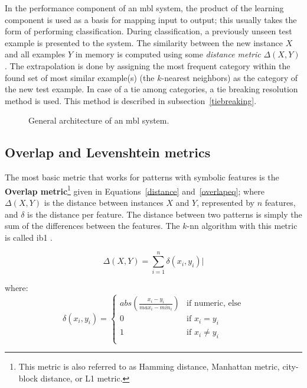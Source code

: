\documentclass{report}
\begin{document}
In the performance component of an {\sc mbl} system, the product of
the learning component is used as a basis for mapping input to output;
this usually takes the form of performing classification.  During
classification, a previously unseen test example is presented to the
system. The similarity between the new instance $X$ and all examples
$Y$ in memory is computed using some {\em distance metric}
$\Delta(X,Y)$. The extrapolation is done by assigning the most
frequent category within the found set of most similar example(s) (the
$k$-nearest neighbors) as the category of the new test example. In
case of a tie among categories, a tie breaking resolution method is
used. This method is described in subsection~\ref{tiebreaking}.

\begin{figure}[htb]
        \begin{center}
                \leavevmode
                \epsfxsize=8cm
                \caption{General architecture of an {\sc mbl} system.
                }
                \label{mbl-method}
        \end{center}
\end{figure}

\subsection{Overlap and Levenshtein metrics}
\label{overlap}

The most basic metric that works for patterns with symbolic features
is the {\bf Overlap metric}\footnote{This metric is also referred to
as Hamming distance, Manhattan metric, city-block distance, or L1
metric.} given in Equations~\ref{distance} and~\ref{overlapeq}; where
$\Delta(X,Y)$ is the distance between instances $X$ and $Y$,
represented by $n$ features, and $\delta$ is the distance per
feature. The distance between two patterns is simply the sum of the
differences between the features. The $k$-{\sc nn} algorithm with this
metric is called {\sc ib1} \cite{Aha+91}. 

\begin{equation}
\Delta(X,Y) = \sum_{i=1}^{n} \delta(x_{i},y_{i}) |
\label{distance}
\end{equation}

where:
\begin{equation}
\delta(x_{i}, y_{i}) = \left\{ \begin{array}{ll}
		abs(\frac{x_{i}-y_{i}}{max_{i}-min_{i}}) & \mbox{if numeric, else}\\
		0 & \mbox{if $x_{i} = y_{i}$}\\
		1 & \mbox{if $x_{i} \neq y_{i}$}\\
	\end{array} \right.
\label{overlapeq}
\end{equation}
\end{document}
